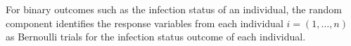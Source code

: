 For binary outcomes such as the infection status of an individual, the random component identifies the response variables from each individual $i=(1,\dots,n)$ as Bernoulli trials for the infection status outcome of each individual.
